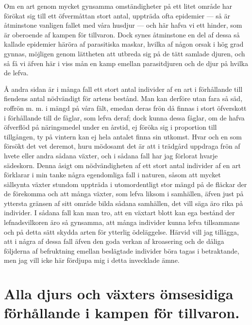Om en art genom mycket gynsamma omständigheter på ett litet område har förökat sig till ett öfvermåttan stort antal, uppträda ofta epidemier — så är åtminstone vanligen fallet med våra husdjur — och här hafva vi ett hinder, som är oberoende af kampen för tillvaron. Dock synes åtminstone en del af dessa så kallade epidemier häröra af parasitiska maskar, hvilka af någon orsak i hög grad gynnas, möjligen genom lättheten att utbreda sig på de tätt samlade djuren, och så få vi äfven här i viss mån en kamp emellan parasitdjuren och de djur på hvilka de lefva.

Å andra sidan är i många fall ett stort antal individer af en art i förhållande till fiendens antal nödvändigt för artens bestånd. Man kan derföre utan fara så säd, roffrön m. m. i mängd på våra fält, emedan deras frön då finnas i stort öfverskott i förhållande till de fåglar, som lefva deraf; dock kunna dessa fåglar, om de hafva öfverflöd på näringsmedel under en årstid, ej föröka sig i proportion till tillgången, ty på vintern kan ej hela antalet finna sin utkomst. Hvar och en som försökt det vet deremot, huru mödosamt det är att i trädgård uppdraga frön af hvete eller andra sådana växter, och i sådana fall har jag förlorat hvarje sädeskorn. Denna åsigt om nödvändigheten af ett stort antal individer af en art förklarar i min tanke några egendomliga fall i naturen, såsom att mycket sällsynta växter stundom uppträda i utomordentligt stor mängd på de fläckar der de förekomma och att många växter, som lefva liksom i samhällen, äfven just på yttersta gränsen af sitt område bilda sådana samhällen, det vill säga äro rika på individer. I sådana fall kan man tro, att en växtart blott kan ega bestånd der lefnadsvilkoren äro så gynsamma, att många individer kunna lefva tillsammans och på detta sätt skydda arten för ytterlig ödeläggelse. Härvid vill jag tillägga, att i några af dessa fall äfven den goda verkan af kroasering och de dåliga följderna af befruktning emellan beslägtade individer böra tagas i betraktande, men jag vill icke här fördjupa mig i detta invecklade ämne.



\section[Växter och djurs ömsesidiga förhållande]{Alla djurs och växters ömsesidiga förhållande i kampen för tillvaron.}

